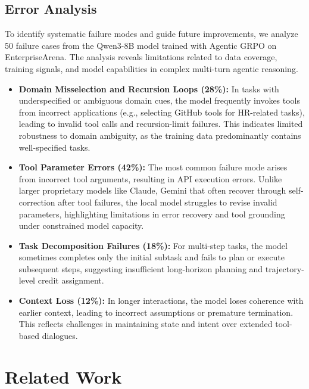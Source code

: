 \documentclass{article}
\theoremstyle{plain}
\theoremstyle{definition}
\theoremstyle{remark}
\begin{document}
\subsection{Error Analysis}
\vspace{-0.2cm}
To identify systematic failure modes and guide future improvements, we analyze 50 failure cases from the Qwen3-8B model trained with Agentic GRPO on EnterpriseArena. The analysis reveals limitations related to data coverage, training signals, and model capabilities in complex multi-turn agentic reasoning.
\noindent
\begin{itemize}[noitemsep, wide=0pt, topsep=0pt]
    \item \textbf{Domain Misselection and Recursion Loops (28\%):} 
    In tasks with underspecified or ambiguous domain cues, the model frequently invokes tools from incorrect applications (e.g., selecting GitHub tools for HR-related tasks), leading to invalid tool calls and recursion-limit failures. This indicates limited robustness to domain ambiguity, as the training data predominantly contains well-specified tasks.

    \item \textbf{Tool Parameter Errors (42\%):} 
    The most common failure mode arises from incorrect tool arguments, resulting in API execution errors. Unlike larger proprietary models like Claude, Gemini that often recover through self-correction after tool failures, the local model struggles to revise invalid parameters, highlighting limitations in error recovery and tool grounding under constrained model capacity.

    \item \textbf{Task Decomposition Failures (18\%):} 
    For multi-step tasks, the model sometimes completes only the initial subtask and fails to plan or execute subsequent steps, suggesting insufficient long-horizon planning and trajectory-level credit assignment.

    \item \textbf{Context Loss (12\%):} 
    In longer interactions, the model loses coherence with earlier context, leading to incorrect assumptions or premature termination. This reflects challenges in maintaining state and intent over extended tool-based dialogues.
\end{itemize}

\vspace{-0.2cm}
\section{Related Work}
\vspace{-0.2cm}
\end{document}
